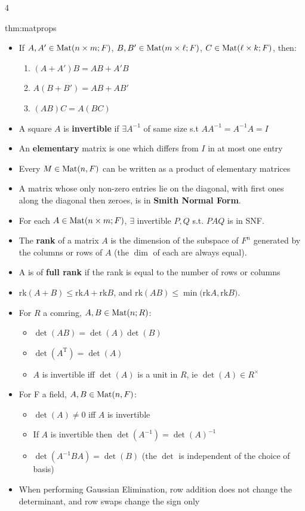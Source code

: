 \documentclass[landscape, 8pt]{extarticle}
\begin{document}
\begin{multicols*}{4}
		
		\begin{thm}{thm:matprops}{ }
		\begin{itemize}
			\item If $A, A' \in\operatorname{Mat}(n\times m; F)$, $B, B' \in \operatorname{Mat}(m \times \ell; F)$, $C \in\operatorname{Mat}(\ell \times k; F)$, then:
			\begin{enumerate}[label=(\roman*)]
				\item $(A + A')B = AB + A'B$
				\item $A(B + B') = AB + AB'$
				\item $(AB)C = A(BC)$
			\end{enumerate}
			\item A square $A$ is \textbf{invertible} if $\exists A^{-1}$ of same size s.t $AA^{-1} = A^{-1}A = I$
			\item An \textbf{elementary} matrix is one which differs from $I$ in at most one entry
			\item Every $M\in\operatorname{Mat}(n, F)$ can be written as a product of elementary matrices
			\item A matrix whose only non-zero entries lie on the diagonal, with first ones along the diagonal then zeroes, is in \textbf{Smith Normal Form}. 
			\item For each $A \in \operatorname{Mat}(n \times m; F)$, $\exists$ invertible $P, Q$ s.t. $PAQ$ is in SNF.
			\item The \textbf{rank} of a matrix $A$ is the dimension of the subspace of $F^n$ generated by the columns or rows of $A$ (the $\dim$ of each are always equal).\\
			\item A is of \textbf{full rank} if the rank is equal to the number of rows or columns
			\item rk$(A + B) \le$rk$A +$rk$B$, and rk$(AB) \le \min($rk$A,$rk$B)$.
			\item For $R$ a comring, $A, B \in \operatorname{Mat}(n; R)$:
			\begin{itemize}[labelindent=2ex]
				\item $\det(AB) = \det(A) \det(B)$
				\item $\det(A^\text{T}) = \det(A)$\\
				\item $A$ is invertible iff $\det(A)$ is a unit in $R$, ie $\det(A) \in R^\times$
			\end{itemize}
			\item For F a field, $A, B\in \operatorname{Mat}(n, F)$:
			\begin{itemize}[labelindent=2ex]
				\item $\det(A) \ne 0$ iff $A$ is invertible
				\item If $A$ is invertible then $\det(A^{-1}) = \det(A)^{-1}$ 
				\item $\det(A^{-1}BA) = \det(B)$ (the $\det$ is independent of the choice of basis)
			\end{itemize}
			\item When performing Gaussian Elimination, row addition does not change the determinant, and row swaps change the sign only
		\end{itemize}
		

\end{thm}
\end{multicols*}
\end{document}
